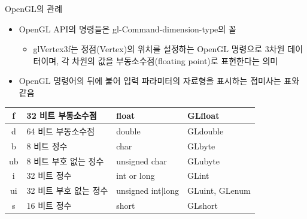 \documentclass{beamer}
\begin{document}
\begin{frame}{OpenGL의 관례}

\begin{itemize}
\item OpenGL API의 명령들은 gl-Command-dimension-type의 꼴
	\begin{itemize}
	\item glVertex3f는 정점(Vertex)의 위치를 설정하는 OpenGL 명령으로 3차원 데이터이며, 각 차원의 값을 부동소수점(floating point)로 표현한다는 의미
	\end{itemize}
\item OpenGL 명령어의 뒤에 붙어 입력 파라미터의 자료형을 표시하는 접미사는 표와 같음
\end{itemize}

\begin{table}
\begin{tabular}{|c|l|l|l|} \hline
f & 32 비트 부동소수점 & float & GLfloat \\ \hline
d & 64 비트 부동소수점 & double & GLdouble \\ \hline
b & 8 비트 정수 & char & GLbyte \\ \hline
ub & 8 비트 부호 없는 정수 & unsigned char & GLubyte \\ \hline
i & 32 비트 정수 & int or long & GLint \\ \hline
ui & 32 비트 부호 없는 정수  & unsigned int$|$long & GLuint, GLenum \\ \hline
s & 16 비트 정수 & short & GLshort \\ \hline
\end{tabular}
\end{table}

\end{frame}
\end{document}
